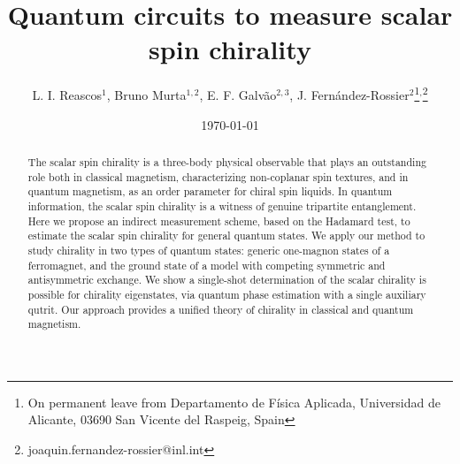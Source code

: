 \documentclass[aps,prl,twocolumn]{revtex4}
\newcommand{\efg}[1]{{\color{orange}[EFG]#1}}
\begin{document}

\title{Quantum circuits to measure scalar spin chirality}

\author{L. I. Reascos$^{1}$, Bruno Murta$^{1,2}$, E. F. Galv\~ao$^{2,3}$, J. Fern\'{a}ndez-Rossier$^2$\footnote{On permanent leave from Departamento de F\'{i}sica Aplicada, Universidad de Alicante, 03690 San Vicente del Raspeig, Spain}$^,$\footnote{joaquin.fernandez-rossier@inl.int} }





\date{\today}


\begin{abstract}


The scalar spin chirality is a three-body physical observable that plays an outstanding role both in classical magnetism, characterizing non-coplanar spin textures, and in quantum magnetism, as an order parameter for chiral spin liquids. In quantum information, the scalar spin chirality is a witness of genuine tripartite entanglement. Here we propose an indirect measurement scheme, based on the Hadamard test, to estimate the scalar spin chirality for general quantum states. We apply
our method to study chirality in two types of quantum states: generic one-magnon states of a ferromagnet, and the ground state of a model with competing symmetric and antisymmetric exchange. We show a single-shot determination of the scalar chirality is possible for chirality eigenstates, via quantum phase estimation with a single auxiliary qutrit. Our approach provides a unified theory of chirality in classical and quantum magnetism.
\end{abstract}
\end{document}
